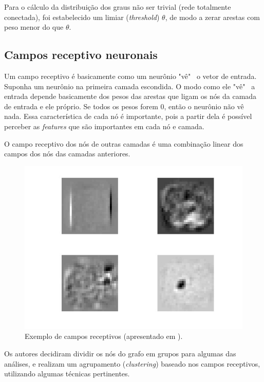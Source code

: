 \documentclass{article}
\begin{document}
        Para o cálculo da distribuição dos graus não ser trivial (rede totalmente conectada), foi estabelecido um limiar (\textit{threshold}) $\theta$, de modo a zerar arestas com peso menor do que $\theta$.

        \subsection{Campos receptivo neuronais}
            \label{field}

            Um campo receptivo é basicamente como um neurônio "vê" \ o vetor de entrada.
            Suponha um neurônio na primeira camada escondida.
            O modo como ele "vê" \ a entrada depende basicamente dos pesos das arestas que ligam os nós da camada de entrada e ele próprio.
            Se todos os pesos forem $0$, então o neurônio não vê nada.
            Essa característica de cada nó é importante, pois a partir dela é possível perceber as \textit{features} que são importantes em cada nó e camada.

            O campo receptivo dos nós de outras camadas é uma combinação linear dos campos dos nós das camadas anteriores.

            \begin{figure}[h!]
                \centering
                \includegraphics[scale=0.2]{Images/Receptive fields.png}
                \caption{Exemplo de campos receptivos (apresentado em \cite{testolin2018deep}).}
                \label{fig5}
            \end{figure}

            Os autores decidiram dividir os nós do grafo em grupos para algumas das análises, e realizam um agrupamento (\textit{clustering}) baseado nos campos receptivos, utilizando algumas técnicas pertinentes.
\end{document}
